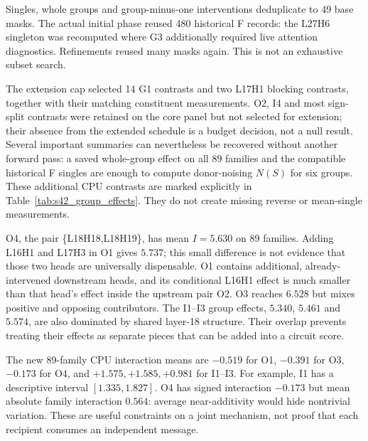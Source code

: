 Singles, whole groups and group-minus-one interventions deduplicate to 49 base masks. The actual initial phase reused 480 historical F records: the L27H6 singleton was recomputed where G3 additionally required live attention diagnostics. Refinements reused many masks again. This is not an exhaustive subset search.

The extension cap selected 14 G1 contrasts and two L17H1 blocking contrasts, together with their matching constituent measurements. O2, I4 and most sign-split contrasts were retained on the core panel but not selected for extension; their absence from the extended schedule is a budget decision, not a null result. Several important summaries can nevertheless be recovered without another forward pass: a saved whole-group effect on all 89 families and the compatible historical F singles are enough to compute donor-noising $N(S)$ for six groups. These additional CPU contrasts are marked explicitly in Table~\ref{tab:s42_group_effects}. They do not create missing reverse or mean-single measurements.

\begin{table}[htbp]\centering\small

\caption{Group noising effects and nonadditivity. The six 89-family interaction rows are additional CPU derivations from measured whole groups and compatible saved F singles. O2 and I4 remain 20-family results. All effects are in logits. ``Heterogeneous'' is the frozen retention label, even when a descriptive signed-mean interval excludes zero.}
\label{tab:s42_group_effects}
\end{table}

O4, the pair \{L18H18,L18H19\}, has mean $I=5.630$ on 89 families. Adding L16H1 and L17H3 in O1 gives $5.737$; this small difference is not evidence that those two heads are universally dispensable. O1 contains additional, already-intervened downstream heads, and its conditional L16H1 effect is much smaller than that head's effect inside the upstream pair O2. O3 reaches $6.528$ but mixes positive and opposing contributors. The I1--I3 group effects, $5.340$, $5.461$ and $5.574$, are also dominated by shared layer-18 structure. Their overlap prevents treating their effects as separate pieces that can be added into a circuit score.

The new 89-family CPU interaction means are $-0.519$ for O1, $-0.391$ for O3, $-0.173$ for O4, and $+1.575,+1.585,+0.981$ for I1--I3. For example, I1 has a descriptive interval $[1.335,1.827]$. O4 has signed interaction $-0.173$ but mean absolute family interaction $0.564$: average near-additivity would hide nontrivial variation. These are useful constraints on a joint mechanism, not proof that each recipient consumes an independent message.

